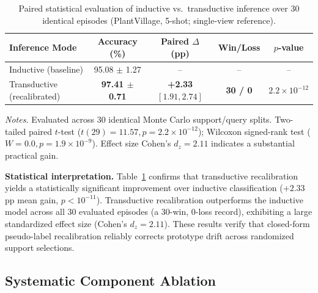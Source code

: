 \documentclass[preprint,12pt]{elsarticle}
\begin{document}
\begin{table}[htbp]
\caption{Paired statistical evaluation of inductive vs.\ transductive inference over 30 identical episodes (PlantVillage, 5-shot; single-view reference).}
\label{tab:paired_test}
\centering

\footnotesize
\setlength{\tabcolsep}{3pt}
\begin{tabular*}{\columnwidth}{@{\extracolsep{\fill}}lcccc}
\toprule
\textbf{Inference Mode} & \textbf{Accuracy (\%)} & \textbf{Paired $\Delta$ (pp)} & \textbf{Win/Loss} & \textbf{$p$-value} \\
\midrule
Inductive (baseline) & 95.08 $\pm$ 1.27 & -- & -- & -- \\
Transductive (recalibrated) & \textbf{97.41 $\pm$ 0.71} & \textbf{+2.33} $[1.91, 2.74]$ & \textbf{30 / 0} & $2.2\times 10^{-12}$ \\
\bottomrule
\end{tabular*}

\vspace{3pt}
\begin{minipage}{\columnwidth}
\footnotesize
\textit{Notes.} Evaluated across 30 identical Monte Carlo support/query splits. Two-tailed paired $t$-test ($t(29)=11.57, p=2.2\times 10^{-12}$); Wilcoxon signed-rank test ($W=0.0, p=1.9\times 10^{-9}$). Effect size Cohen's $d_z = 2.11$ indicates a substantial practical gain.
\end{minipage}
\end{table}

\textbf{Statistical interpretation.} Table~\ref{tab:paired_test} confirms that transductive recalibration yields a statistically significant improvement over inductive classification ($+2.33$\,pp mean gain, $p < 10^{-11}$). Transductive recalibration outperforms the inductive model across all 30 evaluated episodes (a 30-win, 0-loss record), exhibiting a large standardized effect size (Cohen's $d_z = 2.11$). These results verify that closed-form pseudo-label recalibration reliably corrects prototype drift across randomized support selections.

\subsection{Systematic Component Ablation}
\label{sec:ablation}
\end{document}
